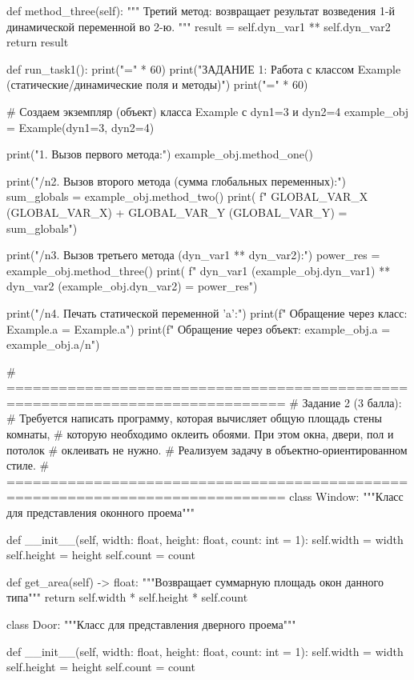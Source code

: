 \documentclass[14pt,a4paper]{extarticle}
\begin{document}
\begin{CodeListing}
    def method_three(self):
        """
        Третий метод: возвращает результат возведения 1-й динамической переменной во 2-ю.
        """
        result = self.dyn_var1 ** self.dyn_var2
        return result


def run_task1():
    print("=" * 60)
    print("ЗАДАНИЕ 1: Работа с классом Example (статические/динамические поля и методы)")
    print("=" * 60)

    # Создаем экземпляр (объект) класса Example с dyn1=3 и dyn2=4
    example_obj = Example(dyn1=3, dyn2=4)

    print("1. Вызов первого метода:")
    example_obj.method_one()

    print("/n2. Вызов второго метода (сумма глобальных переменных):")
    sum_globals = example_obj.method_two()
    print(
        f"  GLOBAL_VAR_X ({GLOBAL_VAR_X}) + GLOBAL_VAR_Y ({GLOBAL_VAR_Y}) = {sum_globals}")

    print("/n3. Вызов третьего метода (dyn_var1 ** dyn_var2):")
    power_res = example_obj.method_three()
    print(
        f"  dyn_var1 ({example_obj.dyn_var1}) ** dyn_var2 ({example_obj.dyn_var2}) = {power_res}")

    print("/n4. Печать статической переменной 'a':")
    print(f"  Обращение через класс: Example.a = {Example.a}")
    print(f"  Обращение через объект: example_obj.a = {example_obj.a}/n")


# ==============================================================================
# Задание 2 (3 балла):
# Требуется написать программу, которая вычисляет общую площадь стены комнаты,
# которую необходимо оклеить обоями. При этом окна, двери, пол и потолок
# оклеивать не нужно.
# Реализуем задачу в объектно-ориентированном стиле.
# ==============================================================================
class Window:
    """Класс для представления оконного проема"""

    def __init__(self, width: float, height: float, count: int = 1):
        self.width = width
        self.height = height
        self.count = count

    def get_area(self) -> float:
        """Возвращает суммарную площадь окон данного типа"""
        return self.width * self.height * self.count


class Door:
    """Класс для представления дверного проема"""

    def __init__(self, width: float, height: float, count: int = 1):
        self.width = width
        self.height = height
        self.count = count


\end{CodeListing}
\end{document}

